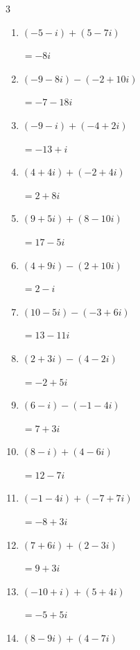 \begin{multicols}{3}
\begin{enumerate}
        $\displaystyle =-1-8i$

  \item $\displaystyle (-5-i) + (5-7i)$

        $\displaystyle =-8i$

  \item $\displaystyle (-9-8i) - (-2+10i)$

        $\displaystyle =-7-18i$

  \item $\displaystyle (-9-i) + (-4+2i)$

        $\displaystyle =-13+i$

  \item $\displaystyle (4+4i) + (-2+4i)$

        $\displaystyle =2+8i$

  \item $\displaystyle (9+5i) + (8-10i)$

        $\displaystyle =17-5i$

  \item $\displaystyle (4+9i) - (2+10i)$

        $\displaystyle =2-i$

  \item $\displaystyle (10-5i) - (-3+6i)$

        $\displaystyle =13-11i$

  \item $\displaystyle (2+3i) - (4-2i)$

        $\displaystyle =-2+5i$

  \item $\displaystyle (6-i) - (-1-4i)$

        $\displaystyle =7+3i$

  \item $\displaystyle (8-i) + (4-6i)$

        $\displaystyle =12-7i$

  \item $\displaystyle (-1-4i) + (-7+7i)$

        $\displaystyle =-8+3i$

  \item $\displaystyle (7+6i) + (2-3i)$

        $\displaystyle =9+3i$

  \item $\displaystyle (-10+i) + (5+4i)$

        $\displaystyle =-5+5i$

  \item $\displaystyle (8-9i) + (4-7i)$


\end{enumerate}
\end{multicols}
